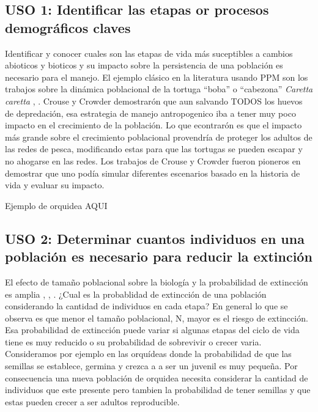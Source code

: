 \documentclass[
]{book}
\theoremstyle{definition}
\theoremstyle{definition}
\theoremstyle{definition}
\theoremstyle{definition}
\theoremstyle{remark}
\begin{document}
\hypertarget{uso-1-identificar-las-etapas-or-procesos-demogruxe1ficos-claves}{%
\subsection{USO 1: Identificar las etapas or procesos demográficos claves}\label{uso-1-identificar-las-etapas-or-procesos-demogruxe1ficos-claves}}

Identificar y conocer cuales son las etapas de vida más suceptibles a cambios abioticos y bioticos y su impacto sobre la persistencia de una población es necesario para el manejo. El ejemplo clásico en la literatura usando PPM son los trabajos sobre la dinámica poblacional de la tortuga ``boba'' o ``cabezona'' \emph{Caretta caretta} \citep{crouse1987stage}, \citep{crowder1994predicting}. Crouse y Crowder demostrarón que aun salvando TODOS los huevos de depredación, esa estrategia de manejo antropogenico iba a tener muy poco impacto en el crecimiento de la población. Lo que econtrarón es que el impacto más grande sobre el crecimiento poblacional provendría de proteger los adultos de las redes de pesca, modificando estas para que las tortugas se pueden escapar y no ahogarse en las redes. Los trabajos de Crouse y Crowder fueron pioneros en demostrar que uno podía simular diferentes escenarios basado en la historia de vida y evaluar su impacto.

Ejemplo de orquidea AQUI

\hypertarget{uso-2-determinar-cuantos-individuos-en-una-poblaciuxf3n-es-necesario-para-reducir-la-extinciuxf3n}{%
\subsection{USO 2: Determinar cuantos individuos en una población es necesario para reducir la extinción}\label{uso-2-determinar-cuantos-individuos-en-una-poblaciuxf3n-es-necesario-para-reducir-la-extinciuxf3n}}

El efecto de tamaño poblacional sobre la biología y la probabilidad de extincción es amplia \citep{shaffer1985population}, \citep{nunney1993assessing}, \citep{harris2022abundance}. ¿Cual es la probablidad de extincción de una población considerando la cantidad de individuos en cada etapa? En general lo que se observa es que menor el tamaño poblacional, N, mayor es el riesgo de extincción. Esa probabilidad de extincción puede variar si algunas etapas del ciclo de vida tiene es muy reducido o su probabilidad de sobrevivir o crecer varia. Consideramos por ejemplo en las orquídeas donde la probabilidad de que las semillas se establece, germina y crezca a a ser un juvenil es muy pequeña. Por consecuencia una nueva población de orquidea necesita considerar la cantidad de individuos que este presente pero tambien la probabilidad de tener semillas y que estas pueden crecer a ser adultos reproducible.
\end{document}
